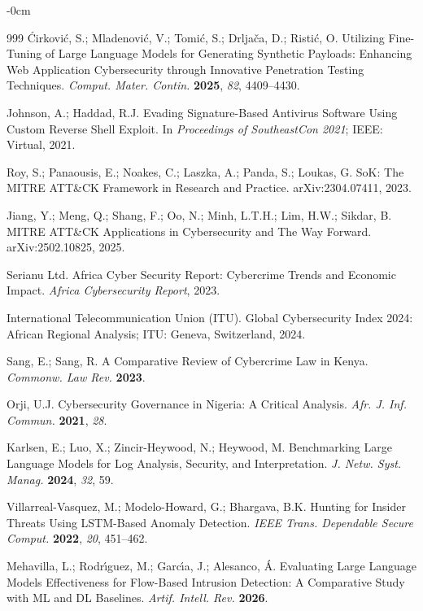 \documentclass[futureinternet,article,submit,pdftex,moreauthors]{Definitions/mdpi}
\begin{document}
\begin{adjustwidth}{-\extralength}{0cm}
\begin{thebibliography}{999}
\'Cirkovi\'c, S.; Mladenovi\'c, V.; Tomi\'c, S.; Drlja\v{c}a, D.; Risti\'c, O.
Utilizing Fine-Tuning of Large Language Models for Generating Synthetic Payloads:
Enhancing Web Application Cybersecurity through Innovative Penetration Testing Techniques.
\textit{Comput. Mater. Contin.} \textbf{2025}, \textit{82}, 4409--4430.

Johnson, A.; Haddad, R.J. Evading Signature-Based Antivirus Software Using Custom Reverse
Shell Exploit. In \textit{Proceedings of SoutheastCon 2021}; IEEE: Virtual, 2021.

Roy, S.; Panaousis, E.; Noakes, C.; Laszka, A.; Panda, S.; Loukas, G. SoK: The MITRE
ATT\&CK Framework in Research and Practice. arXiv:2304.07411, 2023.

Jiang, Y.; Meng, Q.; Shang, F.; Oo, N.; Minh, L.T.H.; Lim, H.W.; Sikdar, B. MITRE
ATT\&CK Applications in Cybersecurity and The Way Forward. arXiv:2502.10825, 2025.

Serianu Ltd. Africa Cyber Security Report: Cybercrime Trends and Economic Impact.
\textit{Africa Cybersecurity Report}, 2023.

International Telecommunication Union (ITU). Global Cybersecurity Index 2024: African
Regional Analysis; ITU: Geneva, Switzerland, 2024.

Sang, E.; Sang, R. A Comparative Review of Cybercrime Law in Kenya.
\textit{Commonw. Law Rev.} \textbf{2023}.

Orji, U.J. Cybersecurity Governance in Nigeria: A Critical Analysis.
\textit{Afr. J. Inf. Commun.} \textbf{2021}, \textit{28}.

Karlsen, E.; Luo, X.; Zincir-Heywood, N.; Heywood, M. Benchmarking Large Language Models
for Log Analysis, Security, and Interpretation.
\textit{J. Netw. Syst. Manag.} \textbf{2024}, \textit{32}, 59.

Villarreal-Vasquez, M.; Modelo-Howard, G.; Bhargava, B.K. Hunting for Insider Threats
Using LSTM-Based Anomaly Detection.
\textit{IEEE Trans. Dependable Secure Comput.} \textbf{2022}, \textit{20}, 451--462.

Mehavilla, L.; Rodr\'{\i}guez, M.; Garc\'{\i}a, J.; Alesanco, \'{A}.
Evaluating Large Language Models Effectiveness for Flow-Based Intrusion Detection:
A Comparative Study with ML and DL Baselines.
\textit{Artif. Intell. Rev.} \textbf{2026}.


\end{thebibliography}
\end{adjustwidth}
\end{document}
